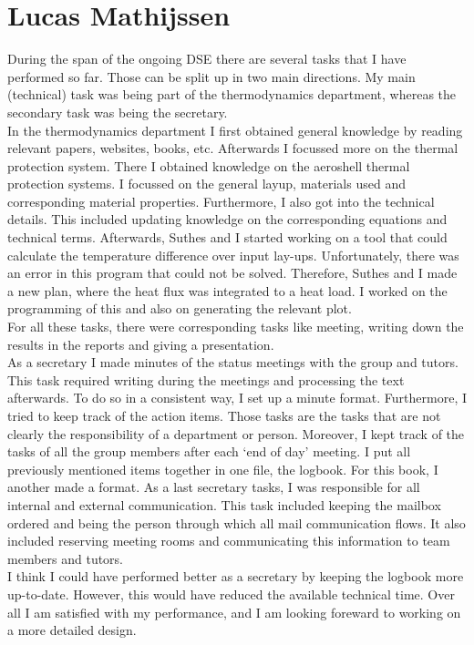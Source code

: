 \section{Lucas Mathijssen}
During the span of the ongoing DSE there are several tasks that I have performed so far. Those can be split up in two main directions. My main (technical) task was being part of the thermodynamics department, whereas the secondary task was being the secretary.\\
In the thermodynamics department I first obtained general knowledge by reading relevant papers, websites, books, etc. Afterwards I focussed more on the thermal protection system. There I obtained knowledge on the aeroshell thermal protection systems. I focussed on the general layup, materials used and corresponding material properties. Furthermore, I also got into the technical details. This included updating knowledge on the corresponding equations and technical terms. Afterwards, Suthes and I started working on a tool that could calculate the temperature difference over input lay-ups. Unfortunately, there was an error in this program that could not be solved. Therefore, Suthes and I made a new plan, where the heat flux was integrated to a heat load. I worked on the programming of this and also on generating the relevant plot. \\
For all these tasks, there were corresponding tasks like meeting, writing down the results in the reports and giving a presentation. \\
As a secretary I made minutes of the status meetings with the group and tutors. This task required writing during the meetings and processing the text afterwards. To do so in a consistent way, I set up a minute format. Furthermore, I tried to keep track of the action items. Those tasks are the tasks that are not clearly the responsibility of a department or person.  Moreover, I kept track of the tasks of all the group members after each ‘end of day’ meeting. I put all previously mentioned items together in one file, the logbook. For this book, I another made a format. As a last secretary tasks, I was responsible for all internal and external communication. This task included keeping the mailbox ordered and being the person through which all mail communication flows. It also included reserving meeting rooms and communicating this information to team members and tutors.\\
I think I could have performed better as a secretary by keeping the logbook more up-to-date. However, this would have reduced the available technical time. Over all I am satisfied with my performance, and I am looking foreward to working on a more detailed design.\\
